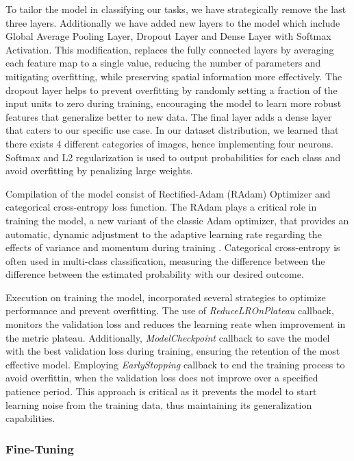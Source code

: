 To tailor the model in classifying our tasks, we have strategically remove the last three layers. Additionally we have added new layers to the model which include Global Average Pooling Layer, Dropout Layer and Dense Layer with Softmax Activation. This modification, replaces the fully connected layers by averaging each feature map to a single value, reducing the number of parameters and mitigating overfitting, while preserving spatial information more effectively. The dropout layer helps to prevent overfitting by randomly setting a fraction of the input units to zero during training, encouraging the model to learn more robust features that generalize better to new data. The final layer adds a dense layer that caters to our specific use case. In our dataset distribution, we learned that there exists 4 different categories of images, hence implementing four neurons. Softmax and L2 regularization is used to output probabilities for each class and avoid overfitting by penalizing large weights. 

Compilation of the model consist of Rectified-Adam (RAdam) Optimizer and categorical cross-entropy loss function. The RAdam plays a critical role in training the model, a new variant of the classic Adam optimizer, that provides an automatic, dynamic adjustment to the adaptive learning rate regarding the effects of variance and momentum during training \cite{9259870}. Categorical cross-entropy is often used in multi-class classification, measuring the difference between the difference between the estimated probability with our desired outcome.

Execution on training the model, incorporated several strategies to optimize performance and prevent overfitting. The use of \textit{ReduceLROnPlateau} callback, monitors the validation loss and reduces the learning reate when improvement in the metric plateau. Additionally, \textit{ModelCheckpoint} callback to save the model with the best validation loss during training, ensuring the retention of the most effective model. Employing \textit{EarlyStopping} callback to end the training process to avoid overfittin, when the validation loss does not improve over a specified patience period. This approach is critical as it prevents the model to start learning noise from the training data, thus maintaining its generalization capabilities.


\subsubsection{Fine-Tuning}

